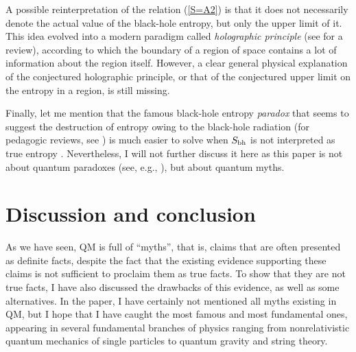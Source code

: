 \documentclass[12pt]{article}
\begin{document}
A possible reinterpretation of the relation (\ref{S=A2}) 
is that it does not necessarily denote the actual 
value of the black-hole entropy, but only the upper limit
of it. This idea evolved into a modern paradigm 
called {\em holographic principle} (see \cite{bousso} for a review), 
according to which the boundary of a region of space contains a lot 
of information about the region itself. However, a 
clear general physical explanation of the 
conjectured holographic principle, or that of the conjectured upper limit
on the entropy in a region, is still missing.   

Finally, let me mention that the famous 
black-hole entropy {\em paradox} that seems to suggest 
the destruction of entropy owing to the black-hole 
radiation (for pedagogic reviews, see \cite{gidd,stro}) 
is much easier to solve 
when $S_{\rm bh}$ is not interpreted as true entropy \cite{nikolbh}.  
Nevertheless, I will 
not further discuss it here as this paper is not about
quantum paradoxes (see, e.g., \cite{laloe}), but about quantum myths.

\section{Discussion and conclusion}

As we have seen, QM is full of ``myths'', 
that is, claims that are often presented as definite facts, despite
the fact that the existing evidence supporting these claims
is not sufficient to proclaim them as true facts. 
To show that they are not true facts, I have also discussed the 
drawbacks of this evidence, as well as some alternatives.
In the paper, I have certainly not mentioned all myths existing
in QM, but I hope that I have caught the most famous
and most fundamental ones, appearing in several fundamental branches
of physics ranging from
nonrelativistic quantum mechanics of single particles to
quantum gravity and string theory.
\end{document}
